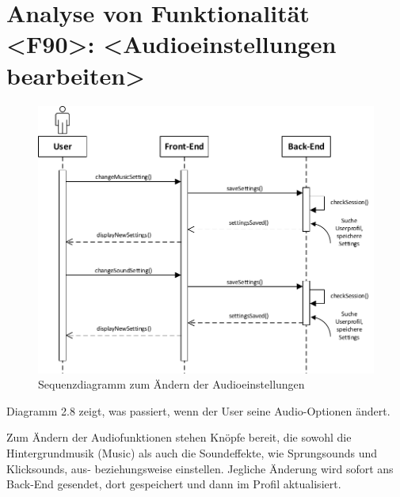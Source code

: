 \section{Analyse von Funktionalität <F90>: <Audioeinstellungen bearbeiten>}
\begin{figure}[h]
\centering
\includegraphics[width=1.3\textwidth]{figures/sequenz_F90.pdf}
\caption{Sequenzdiagramm zum Ändern der Audioeinstellungen}
\label{sequence}
\end{figure}
Diagramm 2.8 zeigt, was passiert, wenn der User seine Audio-Optionen ändert.

Zum Ändern der Audiofunktionen stehen Knöpfe bereit, die sowohl die Hintergrundmusik (\glqq Music\grqq) als auch die Soundeffekte, wie Sprungsounds und Klicksounds,  aus- beziehungsweise einstellen. Jegliche \"Anderung wird sofort ans Back-End gesendet, dort gespeichert und dann im Profil aktualisiert.

\newpage
